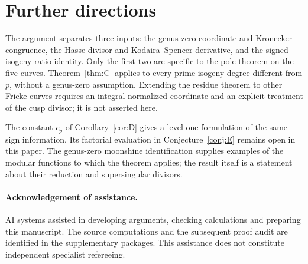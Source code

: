 \documentclass[11pt,a4paper]{article}
\numberwithin{equation}{section}
\theoremstyle{definition}
\theoremstyle{remark}
\begin{document}
\section{Further directions}
The argument separates three inputs: the genus-zero coordinate and Kronecker
congruence, the Hasse divisor and Kodaira--Spencer derivative, and the signed
isogeny-ratio identity. Only the first two are specific to the pole theorem on the
five curves. Theorem~\ref{thm:C} applies to every prime isogeny degree different
from $p$, without a genus-zero assumption. Extending the residue theorem to other
Fricke curves requires an integral normalized coordinate and an explicit treatment
of the cusp divisor; it is not asserted here.

The constant $c_p$ of Corollary~\ref{cor:D} gives a level-one formulation of the
same sign information. Its factorial evaluation in Conjecture~\ref{conj:E}
remains open in this paper. The genus-zero moonshine identification supplies
examples of the modular functions to which the theorem applies; the result itself
is a statement about their reduction and supersingular divisors.

\paragraph{Acknowledgement of assistance.}
AI systems assisted in developing arguments, checking calculations and preparing
this manuscript. The source computations and the subsequent proof audit are
identified in the supplementary packages. This assistance does not constitute
independent specialist refereeing.
\end{document}
